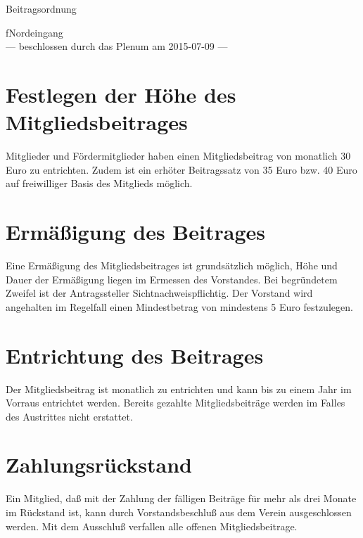 \documentclass[ngerman]{scrartcl}
\begin{document}
\renewcommand*{\othersectionlevelsformat}[3]{\S#3\autodot\enskip}
\begin{titlepage}
\centerline{\Large Beitragsordnung}
\begin{center}
{\Huge fNordeingang}\\[5mm]
\vfill
--- beschlossen durch das Plenum am 2015-07-09 ---
\end{center}
\end{titlepage}
\section{Festlegen der Höhe des Mitgliedsbeitrages}
Mitglieder und Fördermitglieder haben einen Mitgliedsbeitrag von monatlich
30 Euro zu entrichten. Zudem ist ein erhöter Beitragssatz von 35 Euro bzw. 40 Euro auf freiwilliger Basis des Mitglieds möglich.
\section{Ermäßigung des Beitrages}
Eine Ermäßigung des Mitgliedsbeitrages ist grundsätzlich möglich, Höhe und
Dauer der Ermäßigung liegen im Ermessen des Vorstandes. Bei begründetem
Zweifel ist der Antragssteller Sichtnachweispflichtig. Der Vorstand wird angehalten im Regelfall einen Mindestbetrag von mindestens 5 Euro festzulegen.
\section{Entrichtung des Beitrages}
Der Mitgliedsbeitrag ist monatlich zu entrichten und kann bis zu einem Jahr im
Vorraus entrichtet werden. Bereits gezahlte Mitgliedsbeiträge werden im Falles
des Austrittes nicht erstattet.
\section{Zahlungsrückstand}
Ein Mitglied, daß mit der Zahlung der fälligen Beiträge für mehr als drei
Monate im Rückstand ist, kann durch Vorstandsbeschluß aus dem Verein
ausgeschlossen werden. Mit dem Ausschluß verfallen alle offenen Mitgliedsbeitrage.
\end{document}
